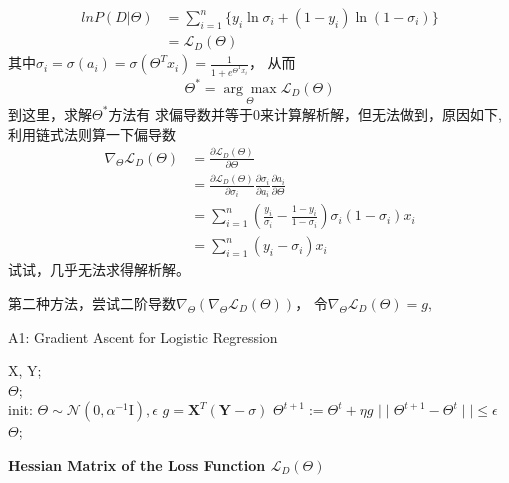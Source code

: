 \documentclass[UTF8]{ctexart}
\numberwithin{equation}{section}
\begin{document}
\begin{equation*}
    \begin{aligned}
        lnP(D|\Theta) &= \sum_{i=1}^n \{y_i\ln\sigma_i +(1-y_i)\ln(1-\sigma_i)\}    \\
        &= \mathcal{L}_D(\Theta)
    \end{aligned}
\end{equation*}
其中$\sigma_i=\sigma(a_i)=\sigma(\Theta^Tx_i)=\frac{1}{1+e^{\Theta^Tx_i}}$， 从而
\begin{equation*}
    \Theta^* = \underset{\Theta}{\arg \max} {\mathcal{L}_D(\Theta)}
\end{equation*}
到这里，求解$\Theta^*$方法有 求偏导数并等于0来计算解析解，但无法做到，原因如下,利用链式法则算一下偏导数
\begin{equation*}
    \begin{aligned}
        \nabla_\Theta \mathcal{L}_D(\Theta) &=\frac{\partial \mathcal{L}_D ( \Theta) }{\partial \Theta} \\
        &= \frac{\partial\mathcal{L}_D ( \Theta)}{\partial \sigma_i}\frac{\partial \sigma_i}{\partial a_i}\frac{\partial a_i}{\partial \Theta}\\
        &= \sum_{i=1}^n(\frac{y_i}{\sigma_i}-\frac{1-y_i}{1-\sigma_i})\sigma_i(1-\sigma_i)x_i \\
        &= \sum_{i=1}^n(y_i-\sigma_i)x_i
    \end{aligned}
\end{equation*}
试试，几乎无法求得解析解。

第二种方法，尝试二阶导数$\nabla_\Theta(\nabla_\Theta \mathcal{L}_D(\Theta) )$， 令$\nabla_\Theta \mathcal{L}_D(\Theta) =g$,

\begin{algorithm}[htb]
    \caption{A1: Gradient Ascent for Logistic Regression}
    \label{alg:A1}
    \begin{algorithmic}[1]
    \REQUIRE
    X, Y; \\
    \ENSURE 
    $\Theta$; \\
    \STATE init: $\Theta \sim \mathcal{N}(0, \alpha^{-1}\mathrm{I}), \epsilon$
    \REPEAT 
    \STATE $g=\mathbf{X}^T(\mathbf{Y}-\sigma)$
    \STATE $\Theta^{t+1} := \Theta^t + \eta g$
    \UNTIL $\mid\mid \Theta^{t+1} -\Theta^t \mid\mid \leq \epsilon$
    \RETURN $\Theta$;
    \end{algorithmic}
\end{algorithm}

\textbf{Hessian Matrix of the Loss Function $\mathcal{L}_D(\Theta)$}
\end{document}

